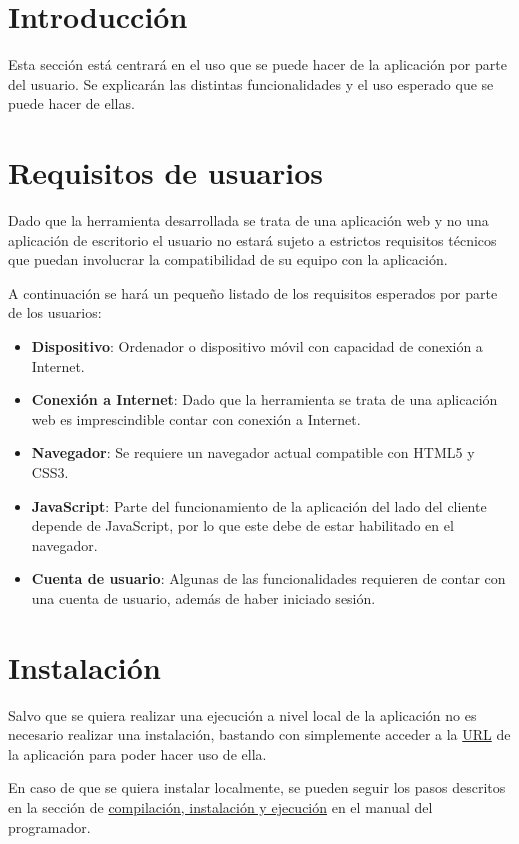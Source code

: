 
\section{Introducción}
Esta sección está centrará en el uso que se puede hacer de la aplicación por parte del usuario. Se explicarán las distintas funcionalidades y el uso esperado que se puede hacer de ellas.
\section{Requisitos de usuarios}
Dado que la herramienta desarrollada se trata de una aplicación web y no una aplicación de escritorio el usuario no estará sujeto a estrictos requisitos técnicos que puedan involucrar la compatibilidad de su equipo con la aplicación.

 A continuación se hará un pequeño listado de los requisitos esperados por parte de los usuarios:
 
 \begin{itemize}
 	\item \textbf{Dispositivo}: Ordenador o dispositivo móvil con capacidad de conexión a Internet.
 	\item \textbf{Conexión a Internet}: Dado que la herramienta se trata de una aplicación web es imprescindible contar con conexión a Internet.
 	\item \textbf{Navegador}: Se requiere un navegador actual compatible con HTML5 y CSS3.
 	\item \textbf{JavaScript}: Parte del funcionamiento de la aplicación del lado del cliente depende de JavaScript, por lo que este debe de estar habilitado en el navegador.
 	\item \textbf{Cuenta de usuario}: Algunas de las funcionalidades requieren de contar con una cuenta de usuario, además de haber iniciado sesión.
 \end{itemize}


\section{Instalación}

Salvo que se quiera realizar una ejecución a nivel local de la aplicación no es necesario realizar una instalación, bastando con simplemente acceder a la \href{https://usmt-68ffcbc61e83.herokuapp.com/home}{URL} de la aplicación para poder hacer uso de ella.

En caso de que se quiera instalar localmente, se pueden seguir los pasos descritos en la sección de \hyperref[sec:compilación]{compilación, instalación y ejecución} en el manual del programador.
